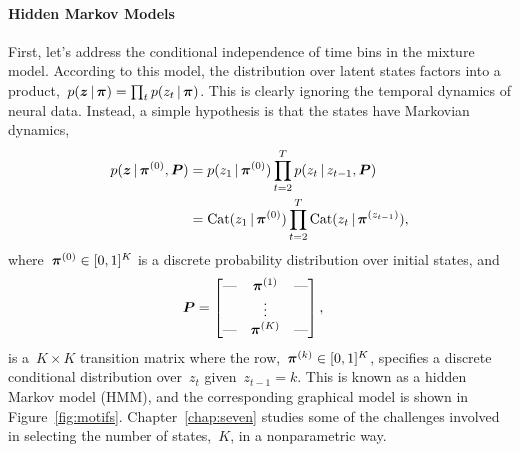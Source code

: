 
\paragraph{Hidden Markov Models}
First, let's address the conditional independence of time bins in the
mixture model. According to this model, the distribution over latent
states factors into a product,~${p(\boldsymbol{z} \,|\, \boldsymbol{\pi}) = \prod_t p(z_t
  \,|\, \boldsymbol{\pi})}$.  This is clearly ignoring the temporal dynamics of
neural data. Instead, a simple hypothesis is that the states have
Markovian dynamics,
\begin{align*}
  p(\boldsymbol{z} \,|\, \boldsymbol{\pi}^{(0)}, \boldsymbol{P}) &= p(z_1 \,|\, \boldsymbol{\pi}^{(0)}) \prod_{t=2}^T p(z_t \,|\, z_{t-1}, \boldsymbol{P}) \\ 
  &= \mathrm{Cat}(z_1 \,|\, \boldsymbol{\pi}^{(0)}) \prod_{t=2}^T \mathrm{Cat}(z_t \,|\, \boldsymbol{\pi}^{(z_{t-1})}),
\end{align*}
where~$\boldsymbol{\pi}^{(0)} \in [0,1]^K$ is a discrete probability distribution over
initial states, and
\begin{align*}
  \boldsymbol{P} &=
        \begin{bmatrix}
          \text{---} &  \boldsymbol{\pi}^{(1)}  & \text{---} \\
            &  \vdots &   \\
          \text{---} &  \boldsymbol{\pi}^{(K)}  & \text{---}
        \end{bmatrix},
\end{align*}
is a~${K \times K}$ transition matrix where the row,~${\boldsymbol{\pi}^{(k)} \in
  [0,1]^K}$, specifies a discrete conditional distribution over~$z_t$
given~${z_{t-1}=k}$.  This is known as a hidden Markov model (HMM),
and the corresponding graphical model is shown in
Figure~\ref{fig:motifs}. Chapter~\ref{chap:seven} studies some of the
challenges involved in selecting the number of states,~$K$, in a
nonparametric way.

